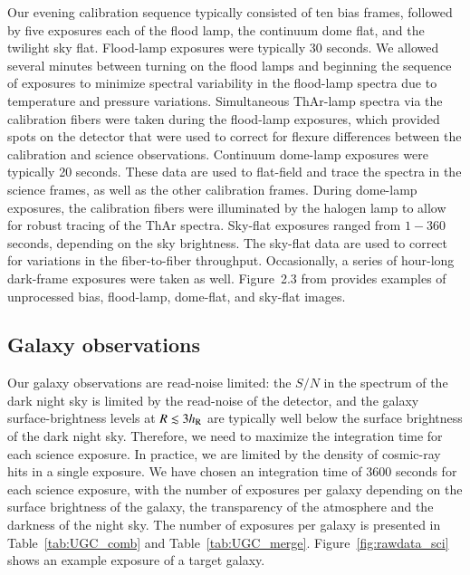 \documentclass[traditabstract]{aa} %
\begin{document}
Our evening calibration sequence typically consisted of ten bias frames,
followed by five exposures each of the flood lamp, the continuum dome flat, and
the twilight sky flat.  Flood-lamp exposures were typically 30 seconds.  We
allowed several minutes between turning on the flood lamps and beginning the
sequence of exposures to minimize spectral variability in the flood-lamp spectra
due to temperature and pressure variations.  Simultaneous ThAr-lamp spectra via
the calibration fibers were taken during the flood-lamp exposures, which
provided spots on the detector that were used to correct for flexure differences
between the calibration and science observations.  Continuum dome-lamp exposures
were typically 20 seconds.  These data are used to flat-field and trace the
spectra in the science frames, as well as the other calibration frames.  During
dome-lamp exposures, the calibration fibers were illuminated by the halogen lamp
to allow for robust tracing of the ThAr spectra.  Sky-flat exposures ranged from
$1-360$ seconds, depending on the sky brightness.  The sky-flat data are used to
correct for variations in the fiber-to-fiber throughput.  Occasionally, a series
of hour-long dark-frame exposures were taken as well.  Figure~2.3 from
\citet{martinsson2011} provides examples of unprocessed bias, flood-lamp,
dome-flat, and sky-flat images.


\subsection{Galaxy observations}

Our galaxy observations are read-noise limited: the $S/N$ in the spectrum of
the dark night sky is limited by the read-noise of the detector, and the galaxy
surface-brightness levels at $R\lesssim3 h_{\rm R}$ are typically well below the
surface brightness of the dark night sky.  Therefore, we need to maximize the
integration time for each science exposure.  In practice, we are limited by the
density of cosmic-ray hits in a single exposure.  We have chosen an integration
time of 3600 seconds for each science exposure, with the number of exposures per
galaxy depending on the surface brightness of the galaxy, the transparency of
the atmosphere and the darkness of the night sky. The number of exposures per
galaxy is presented in Table~\ref{tab:UGC_comb} and Table~\ref{tab:UGC_merge}.
Figure~\ref{fig:rawdata_sci} shows an example exposure of a target galaxy.
\end{document}
